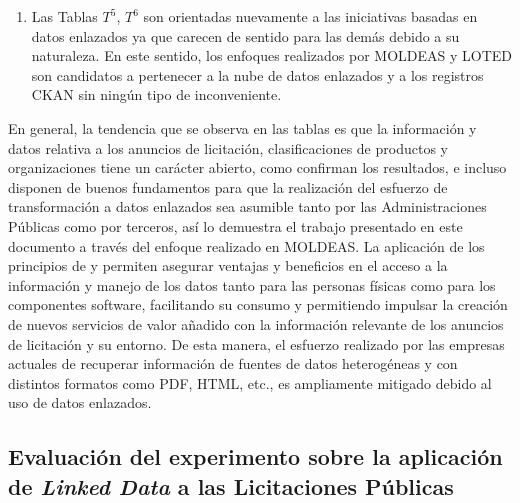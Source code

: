 \begin{enumerate}
\item Las Tablas $T^{5}$, $T^{6}$ son orientadas nuevamente a las iniciativas basadas en datos enlazados ya que carecen 
de sentido para las demás debido a su naturaleza. En este sentido, los enfoques realizados por MOLDEAS y LOTED son 
candidatos a pertenecer a la nube de datos enlazados y a los registros \gls{CKAN} sin ningún tipo de inconveniente.

\end{enumerate}

En general, la tendencia que se observa en las tablas es que la información y datos relativa a los anuncios de licitación, 
clasificaciones de productos y organizaciones tiene un carácter abierto, como confirman los resultados, e incluso disponen
de buenos fundamentos para que la realización del esfuerzo de transformación a datos enlazados sea asumible tanto 
por las Administraciones Públicas como por terceros, así lo demuestra el trabajo presentado en este documento 
a través del enfoque realizado en \gls{MOLDEAS}. La aplicación de los principios de \linkeddata y \opendata permiten 
asegurar ventajas y beneficios en el acceso a la información y manejo de los datos tanto para las personas físicas 
como para los componentes software, facilitando su consumo y permitiendo impulsar la creación de nuevos servicios 
de valor añadido con la información relevante de los anuncios de licitación y su entorno. De esta manera, el esfuerzo 
realizado por las empresas actuales de recuperar información de fuentes de datos heterogéneas y con distintos 
formatos como \gls{PDF}, \gls{HTML}, etc., es ampliamente mitigado debido al uso de datos enlazados.

\subsection{Evaluación del experimento sobre la aplicación de \textit{Linked Data} a las Licitaciones Públicas}


